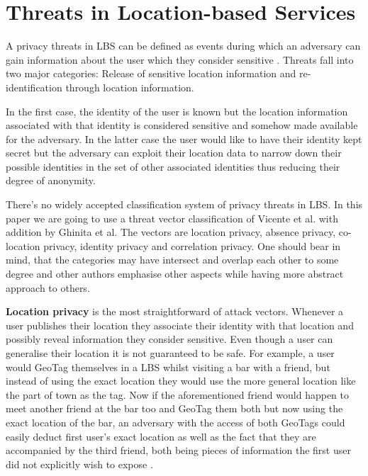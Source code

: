 \documentclass[english]{tktltiki2}
\theoremstyle{definition}
\theoremstyle{remark}
\begin{document}
\section{Threats in Location-based Services}

A privacy threats in LBS can be defined as events during which an adversary can gain information about the user which they consider sensitive \cite{LocationPrivacy}. Threats fall into two major categories: Release of sensitive location information and re-identification through location information. \par In the first case, the identity of the user is known but the location information associated with that identity is considered sensitive and somehow made available for the adversary. In the latter case the user would like to have their identity kept secret but the adversary can exploit their location data to narrow down their possible identities in the set of other associated identities thus reducing their degree of anonymity. \par There's no widely accepted classification system of privacy threats in LBS. In this paper we are going to use a threat vector classification of Vicente et al. with addition by Ghinita et al\cite{LocationPrivacy, Ghinita2008}. The vectors are location privacy, absence privacy, co-location privacy, identity privacy and correlation privacy. One should bear in mind, that the categories may have intersect and overlap each other to some degree and other authors emphasise other aspects while having more abstract approach to others.

\textbf{Location privacy} is the most straightforward of attack vectors. Whenever a user publishes their location they associate their identity with that location and possibly reveal information they consider sensitive. Even though a user can generalise their location it is not guaranteed to be safe. For example, a user would GeoTag themselves in a LBS whilst visiting a bar with a friend, but instead of using the exact location they would use the more general location like the part of town as the tag. Now if the aforementioned friend would happen to meet another friend at the bar too and GeoTag them both but now using the exact location of the bar, an adversary with the access of both GeoTags could easily deduct first user's exact location as well as the fact that they are accompanied by the third friend, both being pieces of information the first user did not explicitly wish to expose \cite{LocationPrivacy}.
\end{document}
